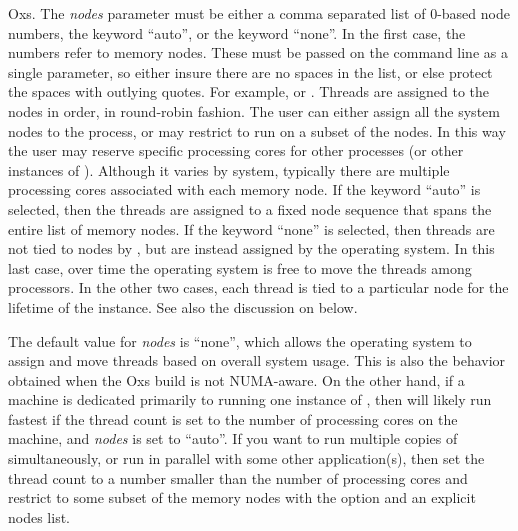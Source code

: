 \begin{description}
  Oxs.  The \textit{nodes} parameter must be either a comma separated
  list of 0-based node numbers, the keyword ``auto'', or the keyword
  ``none''.  In the first case, the numbers refer to memory nodes.
  These must be passed on the command line as a single parameter, so
  either insure there are no spaces in the list, or else protect the
  spaces with outlying quotes.  For example,  or
  .  Threads are assigned to the nodes in
  order, in round-robin fashion.  The user can either assign all the
  system nodes to the  process, or may restrict 
  to run on a subset of the nodes.  In this way the user may reserve
  specific processing cores for other processes (or other instances of
  ).  Although it varies by system, typically there are
  multiple processing cores associated with each memory node.  If the
  keyword ``auto'' is selected, then the threads are assigned to a
  fixed node sequence that spans the entire list of memory nodes.  If
  the keyword ``none'' is selected, then threads are not tied to nodes
  by , but are instead assigned by the operating system.
  In this last case, over time the operating system is free to move
  the threads among processors.  In the other two cases, each thread
  is tied to a particular node for the lifetime of the 
  instance.  See also the discussion on  below.

  The default value for \textit{nodes} is ``none'', which allows the
  operating system to assign and move threads based on overall system
  usage.  This is also the behavior obtained when the Oxs build is not
  NUMA-aware.  On the other hand, if a machine is dedicated primarily
  to running one instance of , then  will
  likely run fastest if the thread count is set to the number of
  processing cores on the machine, and \textit{nodes} is set to
  ``auto''.  If you want to run multiple copies of 
  simultaneously, or run  in parallel with some other
  application(s), then set the thread count to a number smaller than
  the number of processing cores and restrict  to some
  subset of the memory nodes with the  option and an
  explicit nodes list.


\end{description}
